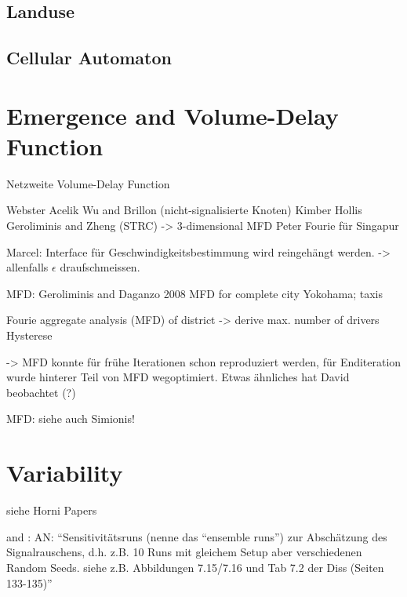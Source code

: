 \subsection{Landuse}

\subsection{Cellular Automaton}

\section{Emergence and Volume-Delay Function}
Netzweite Volume-Delay Function

Webster
Acelik
Wu and Brillon (nicht-signalisierte Knoten)
Kimber Hollis
Geroliminis and Zheng (STRC) -> 3-dimensional MFD
Peter Fourie für Singapur

Marcel: Interface für Geschwindigkeitsbestimmung wird reingehängt werden.
-> allenfalls $\epsilon$ draufschmeissen.

MFD:
Geroliminis and Daganzo 2008
MFD for complete city
Yokohama; taxis

Fourie
aggregate analysis (MFD) of district
-> derive max. number of drivers
Hysterese

-> MFD konnte für frühe Iterationen schon reproduziert werden, für Enditeration wurde hinterer Teil von MFD wegoptimiert. Etwas ähnliches hat David beobachtet (?)

MFD: siehe auch Simionis!

\section{Variability}
\label{sec:variability}

siehe Horni Papers

and \citet[][]{Neumann_PhDThesis_2014}: AN: ``Sensitivitätsruns (nenne das ``ensemble runs'') zur Abschätzung des Signalrauschens, d.h. z.B. 10 Runs mit gleichem Setup aber verschiedenen Random Seeds. siehe z.B. Abbildungen 7.15/7.16 und Tab 7.2 der Diss (Seiten 133-135)''

